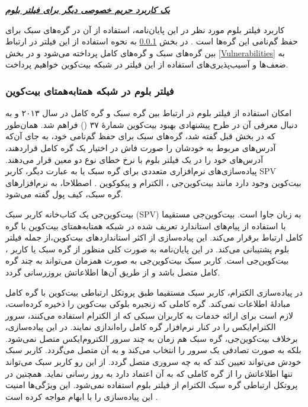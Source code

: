 \textbf{\textit{\underline{یک کاربرد حریم خصوصی دیگر برای فیلتر بلوم}}}

کاربرد فیلتر بلوم مورد نظر در این پایان‌نامه، استفاده از آن در گره‌های سبک برای حفظ گم‌نامی این گره‌ها است \cite{Hearn2013}. در بخش‌  \ref{BloomFilterInP2P} به نحوه استفاده از این فیلتر در ارتباط بین گره‌های سبک و گره‌های کامل پرداخته می‌شود و در بخش \ref{Vulnerabilities} به ضعف‌ها و آسیب‌پذیری‌های استفاده از این فیلتر در شبکه بیت‌کوین خواهیم پرداخت. 


\subsubsection{فیلتر بلوم در شبکه همتا‌به‌همتای بیت‌کوین}
\label{BloomFilterInP2P}

امکان استفاده از فیلتر بلوم در ارتباط بین گره سبک و گره کامل در سال ۲۰۱۳ و به دنبال معرفی آن در طرح پیشنهادی بهبود بیت‌کوین شمارهٔ ۳۷ () \cite{Hearn2013} فراهم شد. همان‌طور که در بخش قبل گفته شد، گره‌‌های سبک برای حفظ گم‌نامی خود، به جای آن‌که آدرس‌های مربوط به خودشان را صورت فاش در اختیار یک گره کامل قراردهند، آدرس‌های خود را در یک فیلتر بلوم با نرخ خطای نوع دو معین قرار می‌دهند. پیاده‌سازی‌های نرم‌افزاری متعددی برای گره سبک یا به عبارت دیگر، کاربر SPV بیت‌کوین وجود دارد مانند بیت‌کوین‌جی \cite{bitcoinj}، الکترام  
\cite{Electrum}
و پیکوکوین
\cite{Garzik}. 
اصطلاحا، به نرم‌افزار‌های گره سبک، کیف پول گفته می‌شود.

بیت‌کوین‌جی یک کتاب‌خانه کاربر سبک (SPV) به زبان جاوا  است. بیت‌کوین‌جی مستقیما با استفاده از پیام‌های استاندارد تعریف شده در شبکه همتا‌به‌همتای بیت‌کوین \cite{P2P_dev,P2P_ref} با گره کامل ارتباط برقرار می‌کند. این پیاده‌سازی از اکثر استاندارد‌های بیت‌کوین،‌از جمله فیلتر بلوم \cite{Hearn2013}  پشتیبانی می‌کند. در این پایان‌نامه به صورت کلی منظور از گره سبک یا کاربر ، بیت‌کوین‌جی است. کاربر سبک بیت‌کوین‌جی به صورت همزمان می‌تواند به چند گره کامل متصل باشد و از طریق آن‌ها اطلاعاتش بروزرسانی گردد.


در پیاده‌سازی الکترام،‌ کاربر سبک مستقیما طبق پروتکل ارتباطی بیت‌کوین با گره کامل مبادلهٔ اطلاعات نمی‌کند. گره کاملی که زنجیره بلوکی بیت‌کوین را ذخیره کرده‌است،‌ لازم است برای ارائه خدمات به کاربران سبکی که از الکترام استفاده می‌کنند،‌ سرور 
الکترام‌ایکس
\cite{ElectrumX}
  را در کنار نرم‌افزار گره کامل راه‌اندازی نمایند. در این پیاده‌سازی، برخلاف بیت‌کوین‌جی، گره سبک هم زمان به چند سرور الکتروم‌ایکس متصل نمی‌شود. بلکه به صورت تصادفی یک سرور را انتخاب می‌کند و به آن متصل می‌گردد. کاربر سبک خودش می‌تواند تعیین کند که به چه سروری متصل گردد. از این رو کاربر سبک می‌تواند  تنها اطلاعاتش را از گره کاملی که به آن اعتماد دارد به روز رسانی نماید.  همچنین در پروتکل ارتباطی گره سبک الکترام از فیلتر بلوم استفاده نمی‌شود. این ویژگی‌ها امنیت این پیاده‌سازی را با ابهام مواجه کرده است \cite{Alison2014}. 
  
